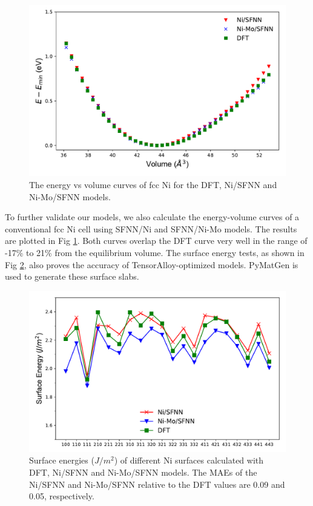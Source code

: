 \documentclass[prb,preprint]{revtex4-2}
\begin{document}
\begin{figure}[h!]
    \centering
    \includegraphics[scale=0.8]{figures/Fig6-energy-volume.pdf}
\caption{\label{fig:energy_volume_Ni} The energy vs volume curves of fcc Ni for
the DFT, Ni/SFNN and Ni-Mo/SFNN models.}
\end{figure}

To further validate our models, we also calculate the energy-volume curves of a 
conventional fcc Ni cell using SFNN/Ni and SFNN/Ni-Mo models. The results are 
plotted in Fig \ref{fig:energy_volume_Ni}. Both curves overlap the DFT curve 
very well in the range of -17\% to 21\% from the equilibrium volume. The surface
energy tests, as shown in Fig \ref{fig:surface_energy_Ni}, also proves the 
accuracy of TensorAlloy-optimized models. PyMatGen\cite{pymatgen,pymatgen-1} is 
used to generate these surface slabs.

\begin{figure}[h!]
    \centering
    \includegraphics[scale=0.8]{figures/Fig7-surface-energy.pdf}
\caption{\label{fig:surface_energy_Ni} Surface energies ($J/m^2$) of different 
Ni surfaces calculated with DFT, Ni/SFNN and Ni-Mo/SFNN models. The MAEs of the 
Ni/SFNN and Ni-Mo/SFNN relative to the DFT values are 0.09 and 0.05, 
respectively.}
\end{figure}
\end{document}

